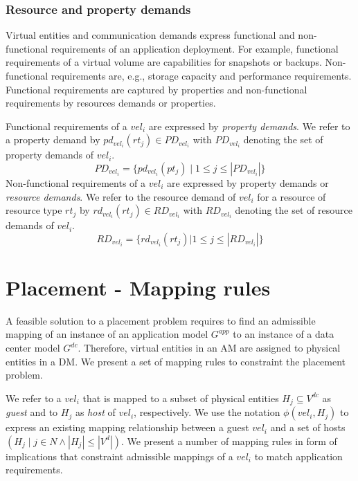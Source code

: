 \documentclass[conference]{IEEEtran}
\begin{document}
\subsubsection{Resource and property demands}

Virtual entities and communication demands express functional and non-functional requirements of an application deployment. For example, functional requirements of a virtual volume are capabilities for snapshots or backups. Non-functional requirements are, e.g., storage capacity and performance requirements. Functional requirements are captured by properties and non-functional requirements by resources demands or properties. 

Functional requirements of a $vel_i$ are expressed by \textit{property demands}. We refer to a property demand by $pd_{vel_i}(rt_j) \in PD_{vel_i}$ with $PD_{vel_i}$ denoting the set of property demands of $vel_i$. 
\begin{equation}
PD_{vel_i} = \{ pd_{vel_i}(pt_j) \mid 1 \leq j \leq \left\vert PD_{vel_i} \right\vert \}
\end{equation}
Non-functional requirements of a $vel_i$ are expressed by property demands or \textit{resource demands}. We refer to the resource demand of $vel_i$ for a resource of resource type $rt_j$ by $rd_{vel_i}(rt_j) \in RD_{vel_i}$ with $RD_{vel_i}$ denoting the set of resource demands of $vel_i$. 
\begin{equation}
RD_{vel_i} = \{ rd_{vel_i}(rt_j) | 1 \leq j \leq \left\vert RD_{vel_i} \right\vert \}
\end{equation}


\section{Placement - Mapping rules}

A feasible solution to a placement problem requires to find an admissible mapping of an instance of an application model $G^{app}$ to an instance of a data center model $G^{dc}$. Therefore, virtual entities in an AM are assigned to physical entities in a DM. We present a set of mapping rules to constraint the placement problem.

We refer to a $vel_i$ that is mapped to a subset of physical entities $H_j \subseteq V^{dc}$ as \textit{guest} and to $H_j$ as \textit{host} of $vel_i$, respectively. We use the notation $\phi(vel_i, H_j)$ to express an existing mapping relationship between a guest $vel_i$ and a set of hosts $( H_j \mid j \in N \wedge \left\vert H_j \right\vert \leq \left\vert V^d \right\vert)$. We present a number of mapping rules in form of implications that constraint admissible mappings of a $vel_i$ to match application requirements.
\end{document}
